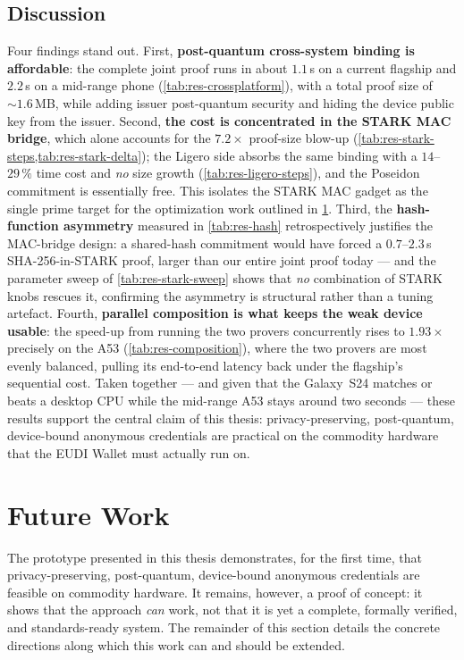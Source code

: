 \documentclass{article}
\begin{document}
\subsection{Discussion}
\label{results:discussion}
Four findings stand out. First, \textbf{post-quantum cross-system binding is
affordable}: the complete joint proof runs in about $1.1$\,s on a current
flagship and $2.2$\,s on a mid-range phone (\cref{tab:res-crossplatform}), with a
total proof size of ${\sim}1.6$\,MB, while adding issuer post-quantum security and
hiding the device public key from the issuer. Second, \textbf{the cost is
concentrated in the STARK MAC bridge}, which alone accounts for the $7.2\times$
proof-size blow-up (\cref{tab:res-stark-steps,tab:res-stark-delta}); the Ligero
side absorbs the same binding with a $14$--$29\,\%$ time cost and \emph{no} size
growth (\cref{tab:res-ligero-steps}), and the Poseidon commitment is essentially
free. This isolates the STARK MAC gadget as the single prime target for the
optimization work outlined in \cref{sec:future-work}. Third, the
\textbf{hash-function asymmetry} measured in \cref{tab:res-hash} retrospectively
justifies the MAC-bridge design: a shared-hash commitment would have forced a
$0.7$--$2.3$\,s SHA-256-in-STARK proof, larger than our entire joint proof today
--- and the parameter sweep of \cref{tab:res-stark-sweep} shows that \emph{no}
combination of STARK knobs rescues it, confirming the asymmetry is structural
rather than a tuning artefact. Fourth, \textbf{parallel composition is what keeps
the weak device usable}: the speed-up from running the two provers concurrently
rises to $1.93\times$ precisely on the A53 (\cref{tab:res-composition}), where the
two provers are most evenly balanced, pulling its end-to-end latency back under
the flagship's sequential cost. Taken together --- and given that the Galaxy~S24
matches or beats a desktop CPU while the mid-range A53 stays around two seconds
--- these results support the central claim of this thesis: privacy-preserving,
post-quantum, device-bound anonymous credentials are practical on the commodity
hardware that the EUDI Wallet must actually run on.

\section{Future Work}
\label{sec:future-work}

The prototype presented in this thesis demonstrates, for the first time, that privacy-preserving, post-quantum, device-bound anonymous credentials are feasible on commodity hardware. It remains, however, a proof of concept: it shows that the approach \emph{can} work, not that it is yet a complete, formally verified, and standards-ready system. The remainder of this section details the concrete directions along which this work can and should be extended.
\end{document}
